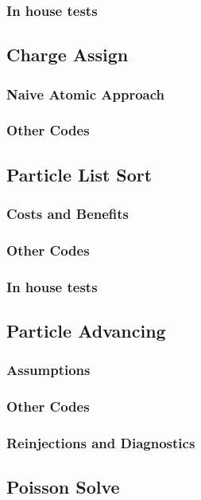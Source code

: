 \documentclass[12pt]{article} %
\begin{document}
		\subsubsection{In house tests}

	\subsection{Charge Assign}
		\subsubsection{Naive Atomic Approach}
		\subsubsection{Other Codes}

	\subsection{Particle List Sort}
		\subsubsection{Costs and Benefits}
		\subsubsection{Other Codes}
		\subsubsection{In house tests}

	\subsection{Particle Advancing}
		\subsubsection{Assumptions}
		\subsubsection{Other Codes}
		\subsubsection{Reinjections and Diagnostics}

	\subsection{Poisson Solve}
\end{document}
